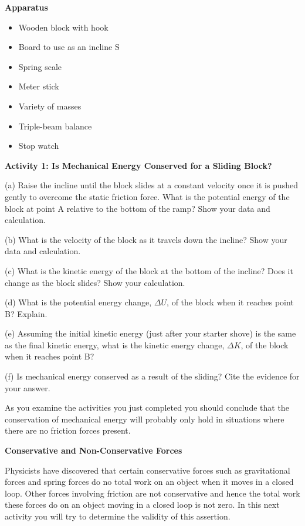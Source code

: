 \textbf{Apparatus} 

\begin{itemize}
\item Wooden block with hook 
\item Board to use as an incline S
\item Spring scale 
\item Meter stick 
\item Variety of masses 
\item Triple-beam balance 
\item Stop watch
\end{itemize}
\textbf{Activity 1: Is Mechanical Energy Conserved for a Sliding Block? }

(a) Raise the incline until the block slides at a constant velocity once it
is pushed gently to overcome the static friction force. What is the potential
energy of the block at point A relative to the bottom of the ramp? Show your
data and calculation.
\vspace{30mm}

(b) What is the velocity of the block as it travels down the incline? Show your
data and calculation.
\vspace{20mm}

(c) What is the kinetic energy of the block at the bottom of the incline? Does
it change as the block slides? Show your calculation.
\vspace{20mm}

(d) What is the potential energy change, $\Delta U$, of the block when it reaches point B? Explain.
\vspace{20mm}

(e) Assuming the initial kinetic energy (just after your starter shove) is the
same as the final kinetic energy, what is the kinetic energy change, $\Delta K$, of the block when it reaches point B? 
\vspace{20mm}

(f) Is mechanical energy conserved as a result of the sliding? Cite the evidence for your answer.
\vspace{20mm}

As you examine the activities you just completed you should conclude that the
conservation of mechanical energy will probably only hold in situations where
there are no friction forces present. 

\textbf{Conservative and Non-Conservative Forces} 

Physicists have discovered that certain conservative forces such as gravitational forces and spring forces do no total work on an object when it moves in a closed loop. Other forces involving friction are not conservative and hence the total work these forces do on an object moving in a closed loop is not zero. In this next activity you will try to determine the validity of this assertion.

